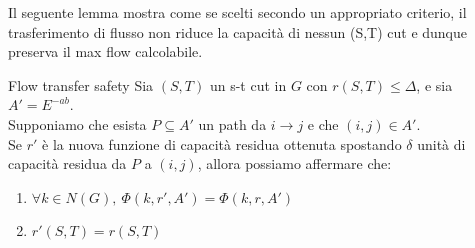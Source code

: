 \documentclass[a4paper, 11pt]{report}
\begin{document}
    Il seguente lemma mostra come se scelti secondo un appropriato criterio, il trasferimento di flusso non riduce la capacità di nessun (S,T) cut e dunque preserva il max flow calcolabile.
    \begin{lemma}[label = {ftsafe}]{Flow transfer safety}{}
        Sia $(S,T)$ un s-t cut in $G$ con $r(S,T)\le \Delta$, e sia $A' = E^{-ab}.$\\
        Supponiamo che esista $P\subseteq A'$ un path da $i\rightarrow j$ e che $(i,j)\in A'$. \\
        Se $r'$ è la nuova funzione di capacità residua ottenuta spostando $\delta$ unità di capacità residua da $P$ a $(i,j)$, allora possiamo affermare che:
        \begin{enumerate}
            \item $\forall k\in N(G),\ \Phi(k,r',A') = \Phi(k,r,A') $
            \item $r'(S,T) = r(S,T)$
        \end{enumerate}
        
    \end{lemma}
\end{document}
